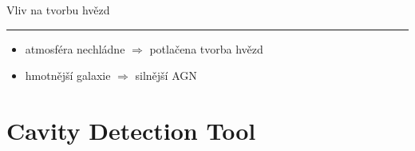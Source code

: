\documentclass[aspectratio=43]{beamer}
\begin{document}
\begin{frame}{\vspace{-2mm}Vliv na tvorbu hvězd\phantom{j$^1$}\\\vspace{1.5mm}\hrule}
\vspace{-30mm}
\begin{itemize}
    \item atmosféra nechládne $\Rightarrow$ potlačena tvorba hvězd\\ \vspace{3mm}
    \item hmotnější galaxie $\Rightarrow$ silnější AGN\\
\end{itemize}
\end{frame}

\section{Cavity Detection Tool}
\end{document}
